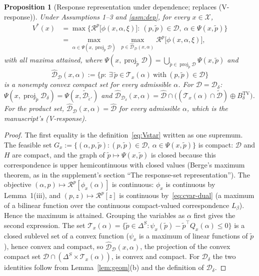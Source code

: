 \documentclass[11pt]{article}
\newtheorem{proposition}{Proposition}
\theoremstyle{definition}
\theoremstyle{remark}
\newcommand{\X}{\mathcal{X}}
\newcommand{\D}{\mathcal{D}}
\newcommand{\Dh}{\hat{\mathcal{D}}}
\newcommand{\Dt}{\tilde{\mathcal{D}}}
\newcommand{\tp}{\tilde{p}}
\newcommand{\teps}{\tilde{\varepsilon}}
\newcommand{\R}{\mathcal{R}}
\DeclareMathOperator{\proj}{proj}
\begin{document}
\begin{proposition}[Response representation under dependence; replaces (V-response)]\label{prop:response}
Under Assumptions 1--3 and \ref{asm:dep}, for every $x\in\X$,
\begin{equation}\label{eq:Vresp}
\begin{aligned}
  V^*(x)&=\max\Big\{\R^p\big[\phi(x,\alpha,\xi)\big]:\ (p,\tp)\in\D,\ \alpha\in\Psi(x,\tp)\Big\}\\
  &=\max_{\alpha\in\Psi(x,\proj_{\tp}\D)}\ \max_{p\in\Dh_\D(x,\alpha)}\R^p\big[\phi(x,\alpha,\xi)\big],
\end{aligned}
\end{equation}
with all maxima attained, where $\Psi(x,\proj_{\tp}\D)=\bigcup_{\tp\in\proj_{\tp}\D}\Psi(x,\tp)$ and
\[
  \Dh_\D(x,\alpha):=\big\{p:\ \exists\,\tp\in\mathcal{T}_x(\alpha)\ \text{with}\ (p,\tp)\in\D\big\}
\]
is a nonempty convex compact set for every admissible $\alpha$. For $\D=\D_\delta$: $\Psi(x,\proj_{\tp}\D_\delta)=\Psi(x,\Dt_{\teps'})$ and $\Dh_{\D_\delta}(x,\alpha)=\Dh\cap\big((\mathcal{T}_x(\alpha)\cap\Dt)\oplus B^{\mathrm{TV}}_\delta\big)$.
For the product set, $\Dh_\D(x,\alpha)=\Dh$ for every admissible $\alpha$, which is the manuscript's (V-response).
\end{proposition}

\begin{proof}
The first equality is the definition~\eqref{eq:Vstar} written as one supremum. The feasible set $G_x:=\{(\alpha,p,\tp):(p,\tp)\in\D,\ \alpha\in\Psi(x,\tp)\}$ is compact: $\D$ and $H$ are compact, and the graph of $\tp\mapsto\Psi(x,\tp)$ is closed because this correspondence is upper hemicontinuous with closed values (Berge's maximum theorem, as in the supplement's section ``The response-set representation''). The objective $(\alpha,p)\mapsto\R^p[\phi_x(\alpha)]$ is continuous: $\phi_x$ is continuous by Lemma~1(iii), and $(p,z)\mapsto\R^p[z]$ is continuous by~\eqref{eq:cvar-dual} (a maximum of a bilinear function over the continuous compact-valued correspondence $L_\beta$). Hence the maximum is attained. Grouping the variables as $\alpha$ first gives the second expression. The set $\mathcal{T}_x(\alpha)=\{\tp\in\Delta^S:\psi_x(\tp)-\tp^\top Q_x(\alpha)\le0\}$ is a closed sublevel set of a convex function ($\psi_x$ is a maximum of linear functions of $\tp$), hence convex and compact, so $\Dh_\D(x,\alpha)$, the projection of the convex compact set $\D\cap(\Delta^S\times\mathcal{T}_x(\alpha))$, is convex and compact. For $\D_\delta$ the two identities follow from Lemma~\ref{lem:geom}(b) and the definition of $\D_\delta$.
\end{proof}
\end{document}
